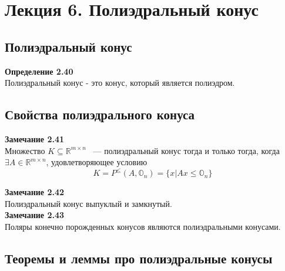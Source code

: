 \section{Лекция 6. Полиэдральный конус }
\subsection{Полиэдральный конус}

\noindent\textbf{Определение 2.40}\\
Полиэдральный конус - это конус, который является полиэдром.\\

\subsection{Свойства полиэдрального конуса}

\noindent\textbf{Замечание 2.41}\\
Множество  $K\subseteq \mathbb{R}^{m\times n}$ ~--- полиэдральный конус тогда и только тогда, когда $\exists A\in\mathbb{R}^{m\times n}$, удовлетворяющее условию
\begin{equation*}
K=P^{\leq}\left(A,\mathbb{O}_{n}\right)=\{x|Ax\leq\mathbb{O}_{n}\}
\end{equation*}

\noindent\textbf{Замечание 2.42}\\
Полиэдральный конус выпуклый и замкнутый. \\

\noindent\textbf{Замечание 2.43}\\
Поляры конечно порожденных конусов являются полиэдральными конусами. \\

\subsection{Теоремы и леммы про полиэдральные конусы}


